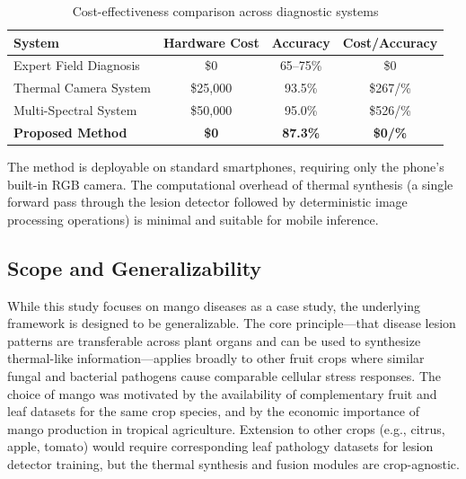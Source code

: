 \documentclass[utf8]{FrontiersinHarvard} %
\begin{document}
\begin{table}[h!]
    \centering
    \caption{Cost-effectiveness comparison across diagnostic systems}
    \label{tab:cost}
    \footnotesize
    \begin{tabular}{lccc}
        \toprule
        \textbf{System} & \textbf{Hardware Cost} & \textbf{Accuracy} & \textbf{Cost/Accuracy} \\
        \midrule
        Expert Field Diagnosis & \$0 & 65--75\% & \$0 \\
        Thermal Camera System & \$25,000 & 93.5\% & \$267/\% \\
        Multi-Spectral System & \$50,000 & 95.0\% & \$526/\% \\
        \textbf{Proposed Method} & \textbf{\$0} & \textbf{87.3\%} & \textbf{\$0/\%} \\
        \bottomrule
    \end{tabular}
\end{table}

The method is deployable on standard smartphones, requiring only the phone's built-in RGB camera. The computational overhead of thermal synthesis (a single forward pass through the lesion detector followed by deterministic image processing operations) is minimal and suitable for mobile inference.

\subsection{Scope and Generalizability}
While this study focuses on mango diseases as a case study, the underlying framework is designed to be generalizable. The core principle---that disease lesion patterns are transferable across plant organs and can be used to synthesize thermal-like information---applies broadly to other fruit crops where similar fungal and bacterial pathogens cause comparable cellular stress responses. The choice of mango was motivated by the availability of complementary fruit and leaf datasets for the same crop species, and by the economic importance of mango production in tropical agriculture. Extension to other crops (e.g., citrus, apple, tomato) would require corresponding leaf pathology datasets for lesion detector training, but the thermal synthesis and fusion modules are crop-agnostic.
\end{document}
